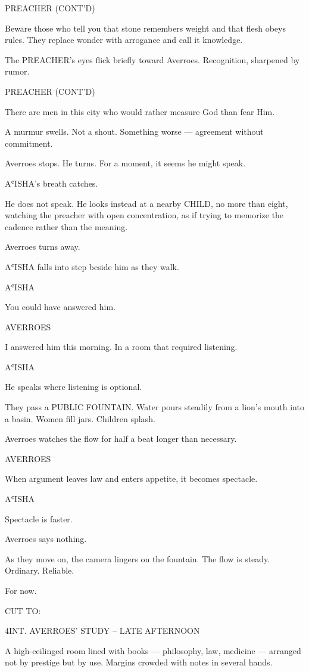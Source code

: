 \documentclass[12pt]{article}
\newlength{\charindent}
\newlength{\dialogueindent}
\newlength{\dialoguewidth}
\newlength{\transitionindent}
\newcommand{\slug}[1]{%
  \needspace{4\baselineskip}%
  \vspace{1.5em}%
  \noindent\MakeUppercase{#1}%
  \nopagebreak[4]%
  \par\vspace{0.75em}%
}
\newcommand{\action}[1]{%
  \noindent#1\par\vspace{0.75em}%
}
\newcommand{\character}[1]{%
  \needspace{3\baselineskip}%
  \par\vspace{0.5em}%
  \noindent\hspace*{\charindent}\MakeUppercase{#1}\nopagebreak[4]%
}
\newcommand{\dialogue}[1]{%
  \par\nobreak\nopagebreak[4]%
  \noindent\hspace*{\dialogueindent}%
  \begin{minipage}[t]{\dialoguewidth}
  #1
  \end{minipage}%
  \par\vspace{0.5em}%
}
\newcommand{\transition}[1]{%
  \needspace{2\baselineskip}%
  \par\vspace{1em}%
  \noindent\hspace*{\transitionindent}\MakeUppercase{#1}%
  \par%
}
\newcommand{\contd}{\textsc{(cont'd)}}
\begin{document}
\character{PREACHER \contd}
\dialogue{Beware those who tell you that stone remembers weight and that flesh obeys rules. They replace wonder with arrogance and call it knowledge.}

\action{The PREACHER’s eyes flick briefly toward Averroes. Recognition, sharpened by rumor.}

\character{PREACHER \contd}
\dialogue{There are men in this city who would rather measure God than fear Him.}

\action{A murmur swells. Not a shout. Something worse — agreement without commitment.}

\action{Averroes stops. He turns. For a moment, it seems he might speak.}

\action{AʿISHA’s breath catches.}

\action{He does not speak. He looks instead at a nearby CHILD, no more than eight, watching the preacher with open concentration, as if trying to memorize the cadence rather than the meaning.}

\action{Averroes turns away.}

\action{AʿISHA falls into step beside him as they walk.}

\character{AʿISHA}
\dialogue{You could have answered him.}

\character{AVERROES}
\dialogue{I answered him this morning. In a room that required listening.}

\character{AʿISHA}
\dialogue{He speaks where listening is optional.}

\action{They pass a PUBLIC FOUNTAIN. Water pours steadily from a lion’s mouth into a basin. Women fill jars. Children splash.}

\action{Averroes watches the flow for half a beat longer than necessary.}

\character{AVERROES}
\dialogue{When argument leaves law and enters appetite, it becomes spectacle.}

\character{AʿISHA}
\dialogue{Spectacle is faster.}

\action{Averroes says nothing.}

\action{As they move on, the camera lingers on the fountain. The flow is steady. Ordinary. Reliable.}

\action{For now.}

\transition{CUT TO:}

\slug{4\quad INT. AVERROES' STUDY -- LATE AFTERNOON}

\action{A high-ceilinged room lined with books — philosophy, law, medicine — arranged not by prestige but by use. Margins crowded with notes in several hands.}
\end{document}
